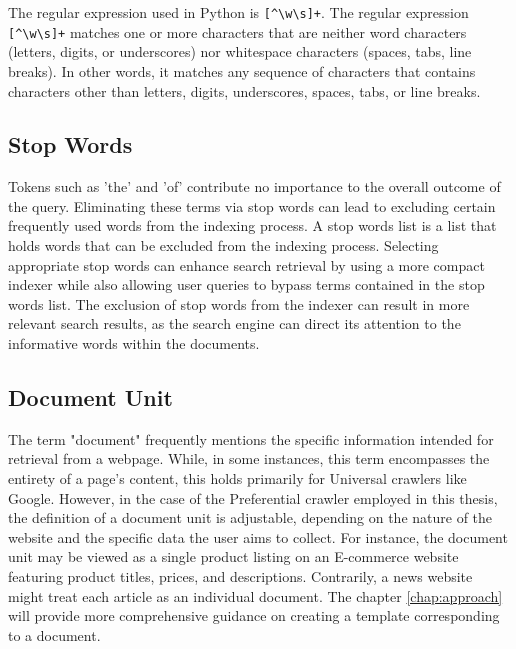 The regular expression used in Python is \verb|[^\w\s]+|. The regular expression \verb|[^\w\s]+| matches one or more characters that are neither word characters (letters, digits, or underscores) nor whitespace characters (spaces, tabs, line breaks). In other words, it matches any sequence of characters that contains characters other than letters, digits, underscores, spaces, tabs, or line breaks.

\subsection*{Stop Words}
Tokens such as 'the' and 'of' contribute no importance to the overall outcome of the query. Eliminating these terms via stop words can lead to excluding certain frequently used words from the indexing process. A stop words list is a list that holds words that can be excluded from the indexing process. Selecting appropriate stop words can enhance search retrieval by using a more compact indexer while also allowing user queries to bypass terms contained in the stop words list. The exclusion of stop words from the indexer can result in more relevant search results, as the search engine can direct its attention to the informative words within the documents.
\subsection*{Document Unit}
The term "document" frequently mentions the specific information intended for retrieval from a webpage. While, in some instances, this term encompasses the entirety of a page's content, this holds primarily for Universal crawlers like Google. However, in the case of the Preferential crawler employed in this thesis, the definition of a document unit is adjustable, depending on the nature of the website and the specific data the user aims to collect. For instance, the document unit may be viewed as a single product listing on an E-commerce website featuring product titles, prices, and descriptions. Contrarily, a news website might treat each article as an individual document. The chapter \ref{chap:approach} will provide more comprehensive guidance on creating a template corresponding to a document.


